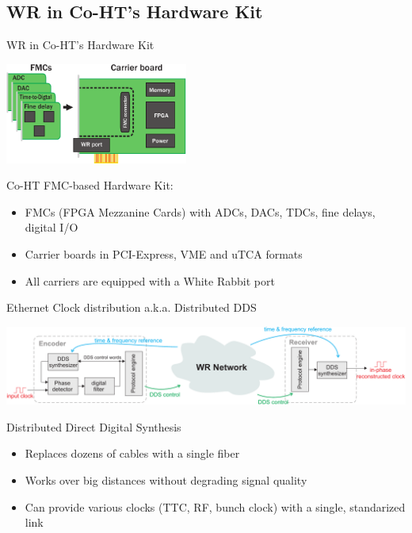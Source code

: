 \documentclass[xcolor=dvipsnames]{beamer}
\begin{document}
\subsection{WR in Co-HT's Hardware Kit}
\begin{frame}{WR in Co-HT's Hardware Kit}
\begin{center}

  \includegraphics[width=6cm]{node/shw_kit}

  \begin{block}{Co-HT FMC-based Hardware Kit:}
    \begin{itemize}
    \item FMCs (FPGA Mezzanine Cards) with ADCs, DACs, TDCs, fine delays, digital I/O
    \item Carrier boards in PCI-Express, VME and uTCA formats
    \item All carriers are equipped with a White Rabbit port
    \end{itemize}
  \end{block}

\end{center}
\end{frame}


\begin{frame}{Ethernet Clock distribution a.k.a. Distributed DDS}
  \begin{center}
    \includegraphics[width=\columnwidth]{applications/remote_dds.pdf}
  \end{center}
  \begin{block}{Distributed Direct Digital Synthesis}
    \begin{itemize}
    \item Replaces dozens of cables with a single fiber
    \item Works over big distances without degrading signal quality
    \item Can provide various clocks (TTC, RF, bunch clock) with a single, standarized link
    \end{itemize}
  \end{block}
\end{frame}
\end{document}
